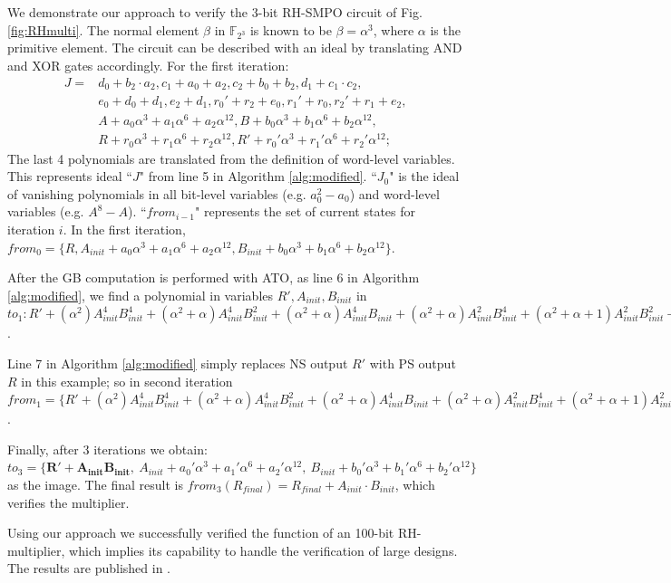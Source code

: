 \begin{Example}
\label{ex:RHSMPO}

We demonstrate our approach to verify the 3-bit RH-SMPO circuit of
Fig.\ref{fig:RHmulti}. The normal element $\beta$ in
$\mathbb{F}_{2^3}$ is known to be $\beta = \alpha^3$, where $\alpha$
is the primitive element. The circuit can be described with an ideal by translating
AND and XOR gates accordingly. For the first iteration:
\begin{align*}
J = &d_0+b_2\cdot a_2,
c_1+a_0+a_2,
c_2+b_0+b_2,
d_1+c_1\cdot c_2,\\
&e_0+d_0+d_1,
e_2+d_1,
r_0'+r_2+e_0,
r_1'+r_0,
r_2'+r_1+e_2,\\
&A+a_0\alpha^3+a_1\alpha^6+a_2\alpha^{12},
B+b_0\alpha^3+b_1\alpha^6+b_2\alpha^{12},\\
&R+r_0\alpha^3+r_1\alpha^6+r_2\alpha^{12},
R'+r_0'\alpha^3+r_1'\alpha^6+r_2'\alpha^{12};
\end{align*}
The last 4 polynomials are translated from the definition of word-level variables.
This represents ideal ``$J$" from line 5 in Algorithm
\ref{alg:modified}. ``$J_0$" is the ideal of vanishing polynomials in all bit-level
variables (e.g. $a_0^2-a_0$) and word-level variables (e.g. $A^8-A$). ``$from_{i-1}$"
represents the set of current states for iteration $i$.
In the first iteration, $from_0 = \{R, A_{init}+a_0\alpha^3+a_1\alpha^6+a_2\alpha^{12},
B_{init}+b_0\alpha^3+b_1\alpha^6+b_2\alpha^{12}\}$.

After the GB computation is performed with ATO, as line 6 in Algorithm \ref{alg:modified},
we find a polynomial in variables $R', A_{init}, B_{init}$ in $to_1 : 
R'+(\alpha^2) A_{init}^4 B_{init}^4+(\alpha^2+\alpha) A_{init}^4 B_{init}^2+(\alpha^2+\alpha) A_{init}^4 B_{init}+(\alpha^2+\alpha) A_{init}^2 B_{init}^4+(\alpha^2+\alpha+1) A_{init}^2 B_{init}^2+(\alpha^2) A_{init}^2 B_{init}+(\alpha^2+\alpha) A_{init} B_{init}^4+(\alpha^2) A_{init} B_{init}^2
$.

Line 7 in Algorithm \ref{alg:modified} simply replaces NS output $R'$ with PS output
$R$ in this example; so in second iteration $from_1 = \{
R'+(\alpha^2) A_{init}^4 B_{init}^4+(\alpha^2+\alpha) A_{init}^4 B_{init}^2+(\alpha^2+\alpha) A_{init}^4 B_{init}+(\alpha^2+\alpha) A_{init}^2 B_{init}^4+(\alpha^2+\alpha+1) A_{init}^2 B_{init}^2+(\alpha^2) A_{init}^2 B_{init}+(\alpha^2+\alpha) A_{init} B_{init}^4+(\alpha^2) A_{init} B_{init}^2
, A_{init}+a_2\alpha^3+a_0\alpha^6+a_1\alpha^{12},
B_{init}+b_2\alpha^3+b_0\alpha^6+b_1\alpha^{12}\}$. 

Finally, after 3 iterations we obtain: $to_3 = \{ \mathbf{R'+A_{init}B_{init},}
~A_{init}+a_0'\alpha^3+a_1'\alpha^6+a_2'\alpha^{12},
~B_{init}+b_0'\alpha^3+b_1'\alpha^6+b_2'\alpha^{12}\}$
as the image. The final result is $from_3(R_{final}) = R_{final}+A_{init}\cdot
B_{init}$, which verifies the multiplier. 
\end{Example}
Using our approach we successfully verified the function of an 100-bit RH-multiplier,
which implies its capability to handle the verification of large designs. The results
are published in \cite{myDATE}.
